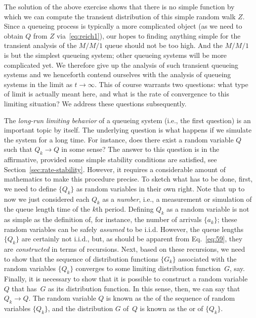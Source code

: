 The solution of the above exercise shows that there is no simple
function by which we can compute the transient distribution of 
this simple random walk $Z$. Since a queueing process is typically a
more complicated object (as we need to obtain $Q$ from $Z$ via~\eqref{eq:reich1}), our
hopes to finding anything simple for the transient analysis of the
$M/M/1$ queue should not be too high. And the $M/M/1$ is but the
simplest queueing system; other queueing systems will be more
complicated yet.  We therefore give up the analysis of such transient
queueing systems and we henceforth contend ourselves with the analysis
of queueing systems in the limit as $t\to\infty$.  This of course
warrants two questions: what type of limit is actually meant here, and
what is the rate of convergence to this limiting situation? We address
these questions subsequently.

The \emph{long-run limiting behavior} of a queueing system (i.e., the first question) is an
important topic by itself. The underlying question is what happens if
we simulate the system for a long time. For instance, does there exist
a random variable $Q$ such that $Q_k\to Q$ in some sense? The answer
to this question is in the affirmative, provided some simple stability
conditions are satisfied, see
Section~\ref{sec:rate-stability}. However, it requires a considerable
amount of mathematics to make this procedure precise. To sketch what
has to be done, first, we need to define $\{Q_k\}$ as random variables
in their own right. Note that up to now we just considered each $Q_k$
as a \emph{number}, i.e., a measurement or simulation of the queue
length time of the $k$th period. Defining $Q_k$ as a random variable
is not as simple as the definition of, for instance, the number of
arrivals $\{a_k\}$; these random variables can be safely
\emph{assumed} to be i.i.d. However, the queue lengths $\{Q_k\}$ are
certainly not i.i.d., but, as should be apparent from
Eq.~\eqref{eq:59}, they are \emph{constructed} in terms of
recursions. Next, based on these recursions, we need to show that the
sequence of distribution functions $\{G_k\}$ associated with the
random variables $\{Q_k\}$ converges to some limiting distribution
function~$G$, say. Finally, it is necessary to show that it is
possible to construct a random variable~$Q$ that has~$G$ as its
distribution function.  In this sense, then, we can say
that~$Q_k \to Q$. The random variable $Q$ is known as the
 of the sequence of random variables
$\{Q_k\}$, and the distribution $G$ of~$Q$ is known as the
 or  of $\{Q_k\}$.

